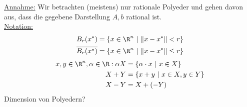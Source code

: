\underline{Annahme:} Wir betrachten (meistens) nur rationale Polyeder und gehen davon aus, dass die gegebene Darstellung $A,b$ rational ist.\\
\underline{Notation:}
\begin{align*}
	B_{r}(x^*) &= \left\{ x \in \R^n \ | \ \|x - x^*\|<r \right\}\\
	\overline{B_{r}(x^*)} &= \left\{ x \in \R^n \ | \ \|x - x^*\|\leq r \right\}
\end{align*}
\begin{align*}
	x,y \in \R^n, \alpha \in \R: \alpha X &= \left\{ \alpha \cdot x \ |\ x \in X \right\}\\
										  X + Y &=\left\{ x + y  \ |\ x \in X, y \in Y \right\}\\
										  X - Y &= X + (-Y)
\end{align*}
Dimension von Polyedern?
